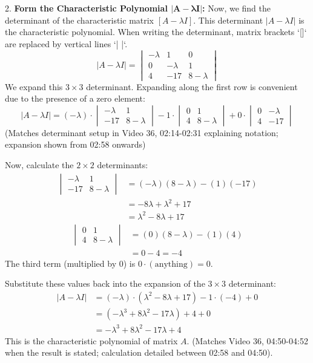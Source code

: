 \documentclass{article}
\begin{document}
2.  \textbf{Form the Characteristic Polynomial $\mathbf{|A - \lambda I|}$:}
    Now, we find the determinant of the characteristic matrix $[A - \lambda I]$. This determinant $|A - \lambda I|$ is the characteristic polynomial. When writing the determinant, matrix brackets `[]` are replaced by vertical lines `| |`.
    \[ |A - \lambda I| = \begin{vmatrix} -\lambda & 1 & 0 \\ 0 & -\lambda & 1 \\ 4 & -17 & 8 - \lambda \end{vmatrix} \]
    We expand this $3 \times 3$ determinant. Expanding along the first row is convenient due to the presence of a zero element:
    \[ |A - \lambda I| = (-\lambda) \cdot \begin{vmatrix} -\lambda & 1 \\ -17 & 8 - \lambda \end{vmatrix} - 1 \cdot \begin{vmatrix} 0 & 1 \\ 4 & 8 - \lambda \end{vmatrix} + 0 \cdot \begin{vmatrix} 0 & -\lambda \\ 4 & -17 \end{vmatrix} \]
    (Matches determinant setup in Video 36, 02:14-02:31 explaining notation; expansion shown from 02:58 onwards)

    Now, calculate the $2 \times 2$ determinants:
    \begin{align*} \begin{vmatrix} -\lambda & 1 \\ -17 & 8 - \lambda \end{vmatrix} &= (-\lambda)(8 - \lambda) - (1)(-17) \\ &= -8\lambda + \lambda^2 + 17 \\ &= \lambda^2 - 8\lambda + 17 \end{align*}
    \begin{align*} \begin{vmatrix} 0 & 1 \\ 4 & 8 - \lambda \end{vmatrix} &= (0)(8 - \lambda) - (1)(4) \\ &= 0 - 4 = -4 \end{align*}
    The third term (multiplied by 0) is $0 \cdot (\text{anything}) = 0$.

    Substitute these values back into the expansion of the $3 \times 3$ determinant:
    \begin{align*} |A - \lambda I| &= (-\lambda) \cdot (\lambda^2 - 8\lambda + 17) - 1 \cdot (-4) + 0 \\ &= (-\lambda^3 + 8\lambda^2 - 17\lambda) + 4 + 0 \\ &= -\lambda^3 + 8\lambda^2 - 17\lambda + 4 \end{align*}
    This is the characteristic polynomial of matrix $A$. (Matches Video 36, 04:50-04:52 when the result is stated; calculation detailed between 02:58 and 04:50).
\end{document}
